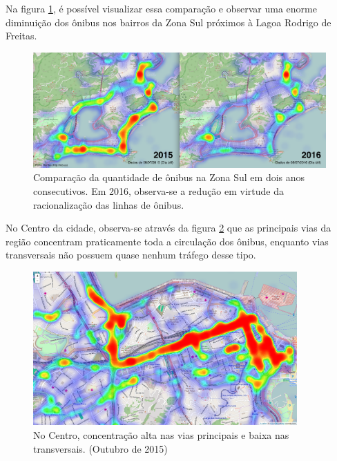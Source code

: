 Na figura \ref{fig:LABEL_FIG_ANALISE_RACIONALIZACAO}, é possível visualizar essa comparação e observar uma enorme diminuição dos ônibus nos bairros da Zona Sul próximos à Lagoa Rodrigo de Freitas. 

\begin{figure}
  \centering
  \includegraphics[width=1.0\textwidth]{imagens/heat_map_zs201516.png}
  \caption{Comparação da quantidade de ônibus na Zona Sul em dois anos consecutivos. Em 2016, observa-se a redução em virtude da racionalização das linhas de ônibus.}
  \label{fig:LABEL_FIG_ANALISE_RACIONALIZACAO}
\end{figure}


No Centro da cidade, observa-se através da figura \ref{fig:LABEL_FIG_ANALISE_CONCENTRACAO_CENTRO} que as principais vias da região concentram praticamente toda a circulação dos ônibus, enquanto vias transversais não possuem quase nenhum tráfego desse tipo.

\begin{figure}
  \centering
  \includegraphics[width=0.9\textwidth]{imagens/heat_map2.png}
  \caption{No Centro, concentração alta nas vias principais e baixa nas transversais. (Outubro de 2015)}
  \label{fig:LABEL_FIG_ANALISE_CONCENTRACAO_CENTRO}
\end{figure}

